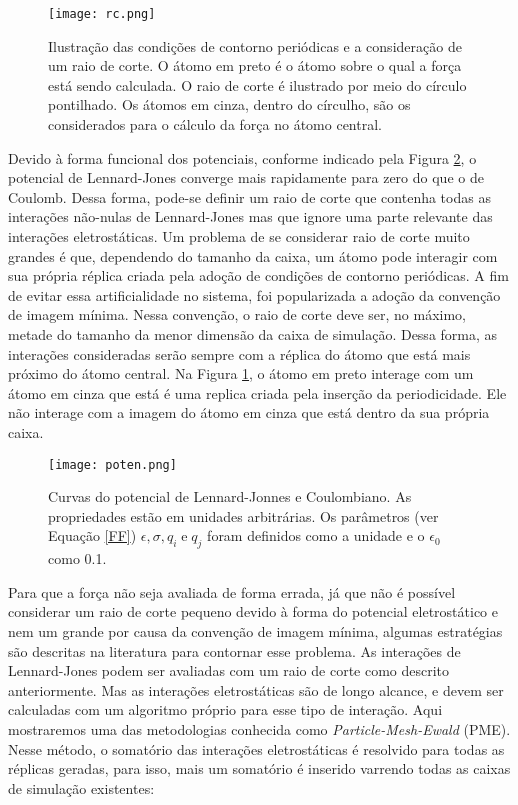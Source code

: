 \begin{figure}[ht!]
\centering
\texttt{[image: rc.png]}
\caption{Ilustração das condições de contorno periódicas e a consideração de um raio de corte. 
O átomo em preto é o átomo sobre o qual a força está sendo calculada.
O raio de corte é ilustrado por meio do círculo pontilhado.
Os átomos em cinza, dentro do círculho, são os considerados para o cálculo da força no átomo central.}
\label{RC}
\end{figure}

Devido à forma funcional dos potenciais, conforme indicado pela Figura \ref{LJCOUL}, o potencial de Lennard-Jones converge mais rapidamente para zero do que o de Coulomb.
Dessa forma, pode-se definir um raio de corte que contenha todas as interações não-nulas de Lennard-Jones mas que ignore uma parte relevante das interações eletrostáticas.
Um problema de se considerar raio de corte muito grandes é que, dependendo do tamanho da caixa, um átomo pode interagir com sua própria réplica criada pela adoção de condições de contorno periódicas.
A fim de evitar essa artificialidade no sistema, foi popularizada a adoção da convenção de imagem mínima.
Nessa convenção, o raio de corte deve ser, no máximo, metade do tamanho da menor dimensão da caixa de simulação.
Dessa forma, as interações consideradas serão sempre com a réplica do átomo que está mais próximo do átomo central.
Na Figura \ref{RC}, o átomo em preto interage com um átomo em cinza que está é uma replica criada pela inserção da periodicidade. 
Ele não interage com a imagem do átomo em cinza que está dentro da sua própria caixa\cite{Frenkel2002}.

\begin{figure}[ht!]
\centering
\texttt{[image: poten.png]}
\caption{Curvas do potencial de Lennard-Jonnes e Coulombiano. As propriedades estão em unidades arbitrárias. Os parâmetros (ver Equação \ref{FF}) $\epsilon, \sigma, q_i \; \text{e} \; q_j$ foram definidos como a unidade e o $\epsilon_0$ como 0.1.}
\label{LJCOUL}
\end{figure}

Para que a força não seja avaliada de forma errada, já que não é possível considerar um raio de corte pequeno devido à forma do potencial eletrostático e nem um grande por causa da convenção de imagem mínima, algumas estratégias são descritas na literatura para contornar esse problema.
As interações de Lennard-Jones podem ser avaliadas com um raio de corte como descrito anteriormente.
Mas as interações eletrostáticas são de longo alcance, e devem ser calculadas com um algoritmo próprio para esse tipo de interação.
Aqui mostraremos uma das metodologias conhecida como \textit{Particle-Mesh-Ewald} (PME)\cite{Darden1993, Essmann1995}.
Nesse método, o somatório das interações eletrostáticas é resolvido para todas as réplicas geradas, para isso, mais um somatório é inserido varrendo todas as caixas de simulação existentes:

